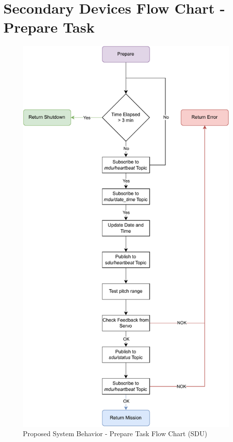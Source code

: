 
\chapter{Secondary Devices Flow Chart - Prepare Task} %

\label{AppendixE}

\begin{figure}[H]
    \centering
    \includegraphics[scale=0.6]{appendices/assets/SDU_PREPARE.pdf}
    \caption{Proposed System Behavior - Prepare Task Flow Chart (SDU)}
    \label{fig:SDU_PREPARE}
\end{figure}

